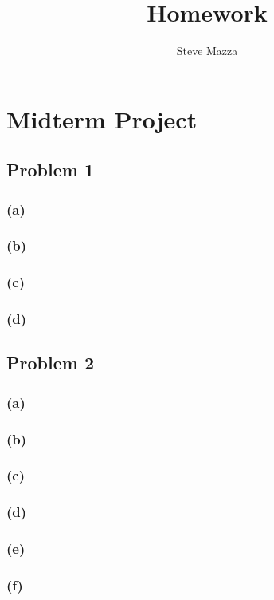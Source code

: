 \documentclass[letterpaper,10pt]{article}
\title{Homework}
\author{Steve Mazza}
\begin{document}
\maketitle

\section*{Midterm Project}
\subsection*{Problem 1}
\subsubsection*{(a)}
\subsubsection*{(b)}
\subsubsection*{(c)}
\subsubsection*{(d)}

\subsection*{Problem 2}
\subsubsection*{(a)}
\subsubsection*{(b)}
\subsubsection*{(c)}
\subsubsection*{(d)}
\subsubsection*{(e)}
\subsubsection*{(f)}
\end{document}
